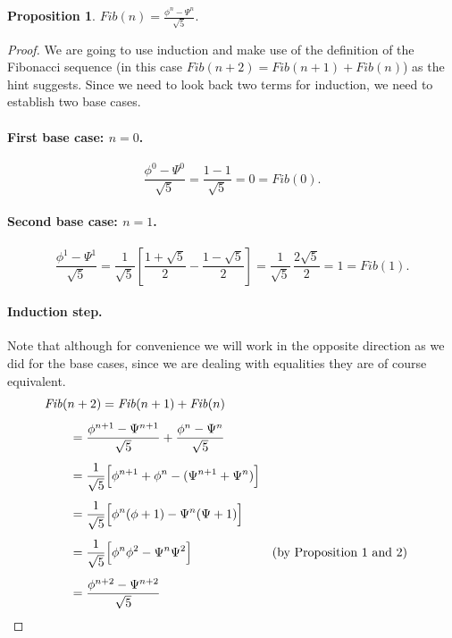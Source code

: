\documentclass{article}
\newtheorem{proposition}{Proposition}
\begin{document}

\begin{proposition}
  $\displaystyle \mathit{Fib}(n) = \frac{\phi^n - \Psi^n}{\sqrt{5}}.$
\end{proposition}

\begin{proof}
  We are going to use induction and make use of the definition of the Fibonacci
  sequence (in this case
  $\mathit{Fib}(n + 2) = \mathit{Fib}(n + 1) + \mathit{Fib}(n)$) as the hint
  suggests.  Since we need to look back two terms for induction, we need to
  establish two base cases.

  \paragraph{First base case: $n = 0$.}
  \begin{equation*}
    \frac{\phi^0 - \Psi^0}{\sqrt{5}} = \frac{1 - 1}{\sqrt{5}} = 0 = \mathit{Fib}(0).
  \end{equation*}

  \paragraph{Second base case: $n = 1$.}
  \begin{equation*}
    \frac{\phi^1 - \Psi^1}{\sqrt{5}}
    = \frac{ 1 }{ \sqrt{5} }
    \left[
      \frac{ 1 + \sqrt{5} }{ 2 } - \frac{ 1 - \sqrt{5} }{ 2 }
    \right]
    = \frac{ 1 }{ \sqrt{5} }\, \frac{ 2 \sqrt{5} }{ 2 }
    = 1
    = \mathit{Fib}(1).
  \end{equation*}

  \paragraph{Induction step.}  Note that although for convenience we will work
  in the opposite direction as we did for the base cases, since we are dealing
  with equalities they are of course equivalent.
  \begin{align*} \MoveEqLeft
    \mathit{Fib}(n + 2) = \mathit{Fib}(n + 1) + \mathit{Fib}(n) \\[1ex]
    &= \frac{\phi^{n + 1} - \Psi^{n + 1}}{\sqrt{5}}
      + \frac{\phi^n - \Psi^n}{\sqrt{5}} \\[1ex]
    &= \frac{ 1 }{ \sqrt{5} }
      \Big[
      \phi^{n + 1} + \phi^n - (\Psi^{n + 1} + \Psi^n)
      \Big] \\[1ex]
    &= \frac{ 1 }{ \sqrt{5} }
      \Big[
      \phi^n(\phi + 1) - \Psi^n(\Psi + 1)
      \Big] \\[1ex]
    &= \frac{ 1 }{ \sqrt{5} }
      \Big[
      \phi^n\phi^2 - \Psi^n\Psi^2
      \Big] && \text{(by Proposition 1 and 2)} \\[1ex]
    &= \frac{\phi^{n + 2} - \Psi^{n + 2}}{\sqrt{5}}
  \end{align*}

\end{proof}
\vspace{5mm}
\end{document}
